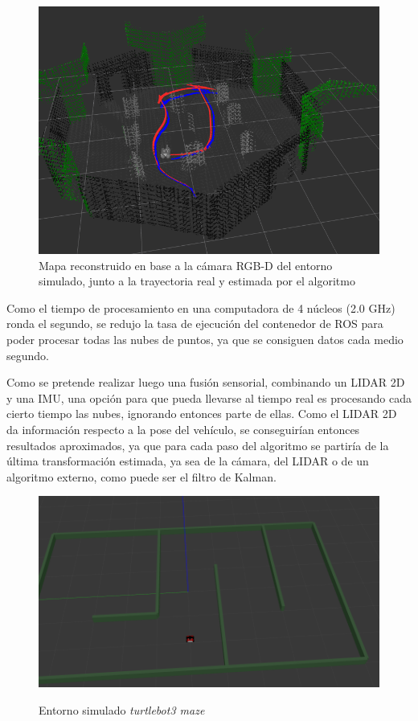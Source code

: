 \begin{figure}[!ht]
    \centering
    \includegraphics[width=0.9\linewidth]{Img/TurtleBotWorldMap3DEstimated.png}%
    \caption{Mapa reconstruido en base a la cámara RGB-D del entorno simulado, junto a la trayectoria real y estimada por el algoritmo}
    \label{fig:turtlebotworldestimatedmap}
\end{figure}
Como el tiempo de procesamiento en una computadora de 4 núcleos (2.0 GHz) ronda el segundo, se redujo la tasa de ejecución del contenedor de ROS para poder procesar todas las nubes de puntos, ya que se consiguen datos cada medio segundo. 

\ifimagenes
Como se pretende realizar luego una fusión sensorial, combinando un LIDAR 2D y una IMU, una opción para que pueda llevarse al tiempo real es procesando cada cierto tiempo las nubes, ignorando entonces parte de ellas. Como el LIDAR 2D da información respecto a la pose del vehículo, se conseguirían entonces resultados aproximados, ya que para cada paso del algoritmo se partiría de la última transformación estimada, ya sea de la cámara, del LIDAR o de un algoritmo externo, como puede ser el filtro de Kalman.
\fi

\begin{figure}[!ht]
    \centering
    {\includegraphics[width=0.9\linewidth]{Img/LIDAR2DMapOriginal.png}}
    \caption{Entorno simulado \textit{turtlebot3 maze}}
    \label{fig:lidar2dmaporiginal}
\end{figure}
